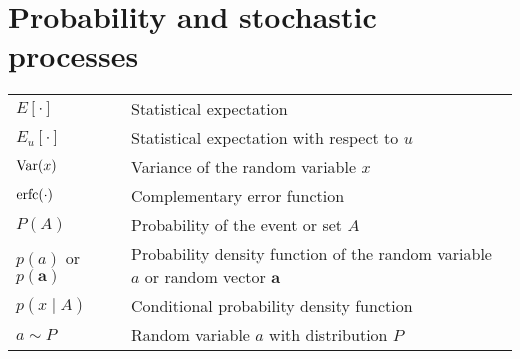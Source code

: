 \documentclass{article}
\begin{document}
\section{Probability and stochastic processes}
\begin{table}[H]
    \begin{tabularx}{\textwidth}{XX}
        \(E\left[ \cdot \right]\) & Statistical expectation\\
        \(E_u\left[ \cdot \right]\) & Statistical expectation with respect to \(u\)\\
        \(\textnormal{Var}(x)\) & Variance of the random variable \(x\)\\
        \(\textnormal{erfc}(\cdot)\) & Complementary error function\\
        \(P(A)\) & Probability of the event or set \(A\)\\
        \(p(a)\) or \(p(\mathbf{a})\) & Probability density function of the random variable \(a\) or random vector \(\mathbf{a}\)\\
        \(p(x\mid A)\) & Conditional probability density function\\
        \(a\sim P\) & Random variable \(a\) with distribution \(P\)
    \end{tabularx}
\end{table}
\end{document}
